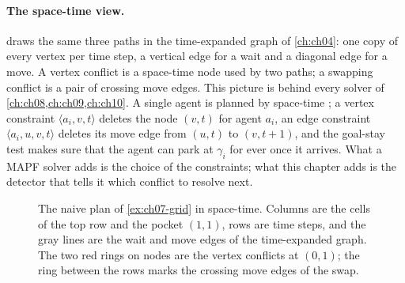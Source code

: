 \paragraph{The space-time view.}
 draws the same three paths in the time-expanded
graph of \cref{ch:ch04}: one copy of every vertex
per time step, a vertical edge for a wait and a diagonal edge for a move. A
vertex conflict is a space-time node used by two paths; a swapping conflict
is a pair of crossing move edges. This picture is behind every solver of
\cref{ch:ch08,ch:ch09,ch:ch10}. A single agent is planned by space-time
\astar; a vertex constraint $\langle a_i, v, t\rangle$ deletes the node
$(v, t)$ for agent $a_i$, an edge constraint $\langle a_i, u, v, t\rangle$
deletes its move edge from $(u, t)$ to $(v, t+1)$, and the goal-stay test
makes sure that the agent can park at $\gamma_i$ for ever once it arrives. What a
MAPF solver adds is the choice of the constraints; what this chapter adds is
the detector that tells it which conflict to resolve next.

\begin{figure}[!htb]
  \centering
  \caption{The naive plan of \cref{ex:ch07-grid} in space-time. Columns are
  the cells of the top row and the pocket $(1,1)$, rows are time steps, and
  the gray lines are the wait and move edges of the time-expanded graph. The
  two red rings on nodes are the vertex conflicts at $(0,1)$; the ring between
  the rows marks the crossing move edges of the swap.}
  \label{fig:ch07-spacetime}
\end{figure}

